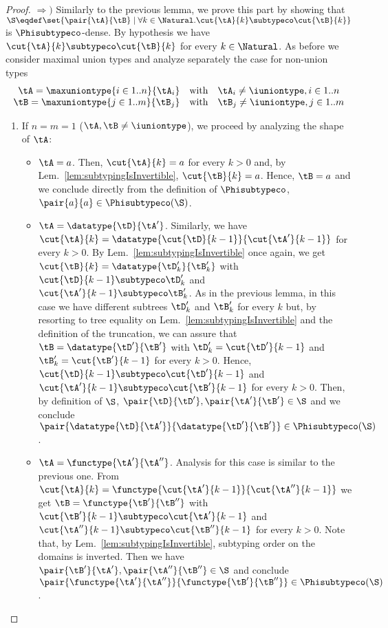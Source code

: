 \begin{proof}
$\Rightarrow)$ Similarly to the previous lemma, we prove this part by showing
that $\S \eqdef \set{\pair{\tA}{\tB} \mathrel| \forall k \in \Natural.
\cut{\tA}{k} \subtypeco \cut{\tB}{k}}$ is $\Phisubtypeco$-dense. By hypothesis
we have $\cut{\tA}{k} \subtypeco \cut{\tB}{k}$ for every $k \in \Natural$. As
before we consider maximal union types and analyze separately the case for
non-union types $$
\begin{array}{r@{\quad\text{with}\quad}l}
\tA = \maxuniontype{i \in 1..n}{\tA_i} & \tA_i \neq \iuniontype, i \in 1..n \\
\tB = \maxuniontype{j \in 1..m}{\tB_j} & \tB_j \neq \iuniontype, j \in 1..m
\end{array} $$
\begin{enumerate}
  \item If $n = m = 1$ (\ie $\tA, \tB \neq \iuniontype$), we proceed by
  analyzing the shape of $\tA$:
  \begin{itemize}
    \item $\tA = a$. Then, $\cut{\tA}{k} = a$ for every $k > 0$ and, by
    Lem.~\ref{lem:subtypingIsInvertible}, $\cut{\tB}{k} = a$. Hence, $\tB = a$
    and we conclude directly from the definition of $\Phisubtypeco$,
    $\pair{a}{a} \in \Phisubtypeco\!\left(\S\right)$.
    
    \item $\tA = \datatype{\tD}{\tA'}$. Similarly, we have $\cut{\tA}{k} =
    \datatype{\cut{\tD}{k-1}}{\cut{\tA'}{k-1}}$ for every $k > 0$. By
    Lem.~\ref{lem:subtypingIsInvertible} once again, we get $\cut{\tB}{k} =
    \datatype{\tD'_k}{\tB'_k}$ with $\cut{\tD}{k-1} \subtypeco \tD'_k$ and
    $\cut{\tA'}{k-1} \subtypeco \tB'_k$. As in the previous lemma, in this case
    we have different subtrees $\tD'_k$ and $\tB'_k$ for every $k$ but, by
    resorting to tree equality on Lem.~\ref{lem:subtypingIsInvertible} and the
    definition of the truncation, we can assure that $\tB =
    \datatype{\tD'}{\tB'}$ with $\tD'_k = \cut{\tD'}{k-1}$ and $\tB'_k =
    \cut{\tB'}{k-1}$ for every $k > 0$. Hence, $\cut{\tD}{k-1} \subtypeco
    \cut{\tD'}{k-1}$ and $\cut{\tA'}{k-1} \subtypeco \cut{\tB'}{k-1}$ for every
    $k > 0$. Then, by definition of $\S$, $\pair{\tD}{\tD'}, \pair{\tA'}{\tB'}
    \in \S$ and we conclude $\pair{\datatype{\tD}{\tA'}}{\datatype{\tD'}{\tB'}}
    \in \Phisubtypeco\!\left(\S\right)$.
    
    \item $\tA = \functype{\tA'}{\tA''}$. Analysis for this case is similar to
    the previous one. From $\cut{\tA}{k} =
    \functype{\cut{\tA'}{k-1}}{\cut{\tA''}{k-1}}$ we get $\tB =
    \functype{\tB'}{\tB''}$ with $\cut{\tB'}{k-1} \subtypeco \cut{\tA'}{k-1}$
    and $\cut{\tA''}{k-1} \subtypeco \cut{\tB''}{k-1}$ for every $k > 0$. Note
    that, by Lem.~\ref{lem:subtypingIsInvertible}, subtyping order on the
    domains is inverted. Then we have $\pair{\tB'}{\tA'}, \pair{\tA''}{\tB''}
    \in \S$ and conclude $\pair{\functype{\tA'}{\tA''}}{\functype{\tB'}{\tB''}}
    \in \Phisubtypeco\!\left(\S\right)$.
  \end{itemize}
  

\end{enumerate}
\end{proof}
